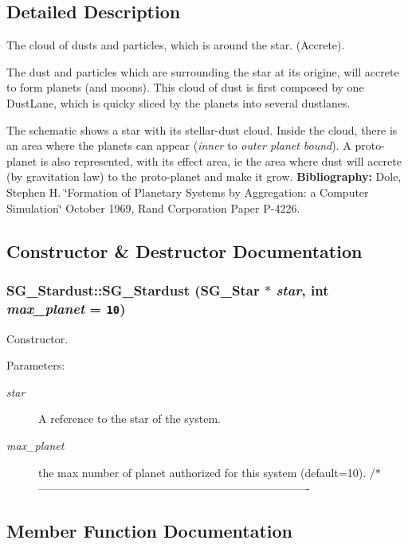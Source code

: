 \subsection{Detailed Description}
The cloud of dusts and particles, which is around the star. (Accrete). 

The dust and particles which are surrounding the star at its origine, will accrete to form planets (and moons). This cloud of dust is first composed by one Dust\-Lane, which is quicky sliced by the planets into several dustlanes.

The schematic shows a star with its stellar-dust cloud. Inside the cloud, there is an area where the planets can appear ({\em inner\/} to {\em outer planet bound\/}). A proto-planet is also represented, with its effect area, ie the area where dust will accrete (by gravitation law) to the proto-planet and make it grow.  {\bf Bibliography:} Dole, Stephen H. \char`\"{}Formation of Planetary Systems by Aggregation: a Computer Simulation\char`\"{} October 1969, Rand Corporation Paper P-4226. 



\subsection{Constructor \& Destructor Documentation}
\subsubsection{\setlength{\rightskip}{0pt plus 5cm}SG\_\-Stardust::SG\_\-Stardust ({\bf SG\_\-Star} $\ast$ {\em star}, int {\em max\_\-planet} = {\tt 10})}\label{class_s_g___stardust_a0}


Constructor. 

\begin{Desc}
\item[Parameters:]
\begin{description}
\item[{\em star}]A reference to the star of the system. \item[{\em max\_\-planet}]the max number of planet authorized for this system (default=10). /$\ast$ ------------------------------------------------------------------------- \end{description}
\end{Desc}


\subsection{Member Function Documentation}
